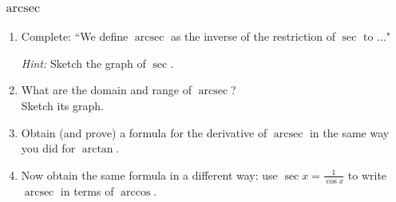 \documentclass[14pt]{beamer}
\newcommand {\DS} [1] {${\displaystyle #1}$}
\newcommand{\arcsec}{\operatorname{arcsec}}
\begin{document}
\begin{frame}[t]
\frametitle{$\arcsec$}


\begin{enumerate}

\item  Complete: ``We define $\arcsec$ as the inverse of 
 the restriction of $\sec$ to ..."

\emph{Hint:} Sketch the graph of $\sec$.  

\vfill

\item What are the domain and range of $\arcsec$?  \\ Sketch its graph.

\vfill

\item Obtain (and prove) a formula for the derivative of $\arcsec$ in the same way you did for $\arctan$.

\vfill

\item Now obtain the same formula  in a different way:  use \DS{\sec x = \frac{1}{\cos x}} to write \DS{\arcsec} in terms of \DS{\arccos}.

\end{enumerate}


\end{frame}

\end{document}
